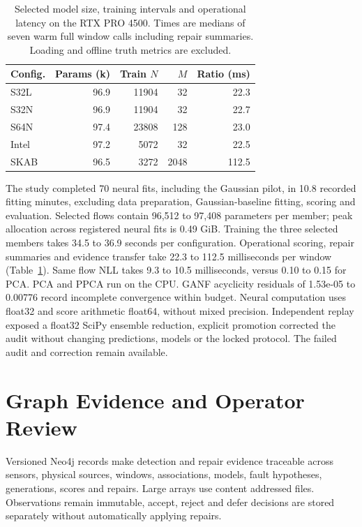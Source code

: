 \documentclass{llncs}
\newcommand{\1}{\mathbf{1}}
\begin{document}
\begin{table}[!tbp]
\centering
\caption{Selected model size, training intervals and operational latency on the RTX PRO 4500. Times are medians of seven warm full window calls including repair summaries. Loading and offline truth metrics are excluded.}
\label{tab:runtime}
\small
\begin{tabular}{lrrrr}
\toprule
Config. & Params (k) & Train $N$ & $M$ & Ratio (ms) \\
\midrule
S32L & 96.9 & 11904 & 32 & 22.3 \\
S32N & 96.9 & 11904 & 32 & 22.7 \\
S64N & 97.4 & 23808 & 128 & 23.0 \\
Intel & 97.2 & 5072 & 32 & 22.5 \\
SKAB & 96.5 & 3272 & 2048 & 112.5 \\
\bottomrule
\end{tabular}
\end{table}
The study completed 70 neural fits, including the Gaussian pilot, in 10.8 recorded fitting minutes, excluding data preparation, Gaussian-baseline fitting, scoring and evaluation. Selected flows contain 96,512 to 97,408 parameters per member; peak allocation across registered neural fits is 0.49 GiB. Training the three selected members takes 34.5 to 36.9 seconds per configuration. Operational scoring, repair summaries and evidence transfer take 22.3 to 112.5 milliseconds per window (Table~\ref{tab:runtime}). Same flow NLL takes 9.3 to 10.5 milliseconds, versus 0.10 to 0.15 for PCA. PCA and PPCA run on the CPU. GANF acyclicity residuals of 1.53e-05 to 0.00776 record incomplete convergence within budget. Neural computation uses float32 and score arithmetic float64, without mixed precision. Independent replay exposed a float32 SciPy ensemble reduction, explicit promotion corrected the audit without changing predictions, models or the locked protocol. The failed audit and correction remain available.



\section{Graph Evidence and Operator Review}
Versioned Neo4j records make detection and repair evidence traceable across sensors, physical sources, windows, associations, models, fault hypotheses, generations, scores and repairs. Large arrays use content addressed files. Observations remain immutable, accept, reject and defer decisions are stored separately without automatically applying repairs.
\end{document}
